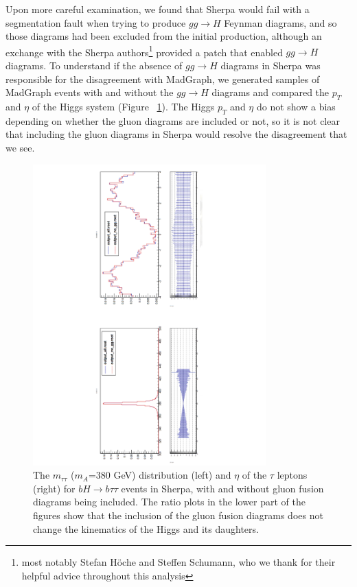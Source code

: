 Upon more careful examination, we found that Sherpa would fail with a segmentation fault
when trying to produce 
$gg\rightarrow H$ Feynman diagrams, and so those diagrams had been excluded from
the initial production, although
an exchange with the Sherpa authors\footnote{most notably Stefan H\"{o}che and Steffen 
Schumann, who we thank for their helpful advice throughout this analysis} provided 
a patch that enabled $gg\rightarrow H$ diagrams.  To understand
if the absence of $gg\rightarrow H$ diagrams in Sherpa was responsible for the disagreement
with MadGraph, we generated samples of MadGraph events with and without the $gg\rightarrow H$
diagrams and compared the $p_T$ and $\eta$ of the Higgs system (Figure ~\ref{fig:ggH}).
The Higgs $p_T$ and $\eta$ do not show a bias depending on whether the gluon diagrams
are included or not, so it is not clear that including the gluon diagrams in Sherpa would
resolve the disagreement that we see. 

\begin{figure}
  \center
  \includegraphics[width=0.8\textwidth, angle=270]{MonteCarlo/figures/ggH.pdf}
  \caption{The $m_{\tau\tau}$ ($m_A$=380 GeV) distribution (left) and $\eta$ of the $\tau$ leptons (right)
  for $bH\rightarrow b\tau\tau$ events in Sherpa,
  with and without gluon fusion diagrams being included.  The ratio plots in the lower part of the
  figures show that the inclusion of the gluon fusion diagrams does not change the kinematics of the
  Higgs and its daughters. 
  \label{fig:ggH}}
\end{figure}

